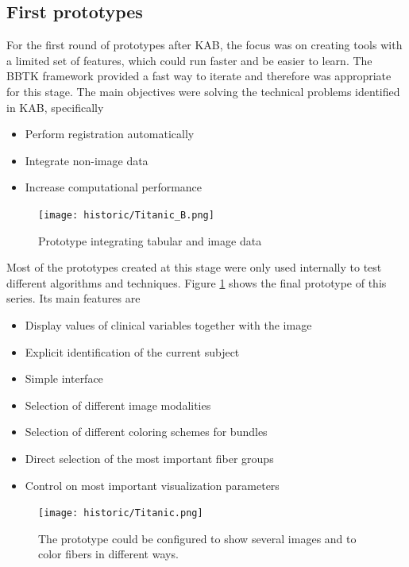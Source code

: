 \subsection{First prototypes}


For the first round of prototypes after KAB, the focus was on creating tools with a limited set of features, which could run faster and be easier to learn. The BBTK framework provided a fast way to iterate and therefore was appropriate for this stage. The main objectives were solving the technical problems identified in KAB, specifically
\begin{itemize}
\item Perform registration automatically
\item Integrate non-image data
\item Increase computational performance
\end{itemize}

\begin{figure}
\centering
\texttt{[image: historic/Titanic\_B.png]}
\caption{\label{fig_titanic}Prototype integrating tabular and image data}
\end{figure}

Most of the prototypes created at this stage were only used internally to test different algorithms and techniques. Figure \ref{fig_titanic} shows the final prototype of this series. Its main features are
\begin{itemize}
\item Display values of clinical variables together with the image
\item Explicit identification of the current subject
\item Simple interface
\item Selection of different image modalities
\item Selection of different coloring schemes for bundles
\item Direct selection of the most important fiber groups
\item Control on most important visualization parameters
\end{itemize}

\begin{figure}
\centering
\texttt{[image: historic/Titanic.png]}
\caption{\label{fig_titanic_2}The prototype could be configured to show several images and to color fibers in different ways.}
\end{figure}

